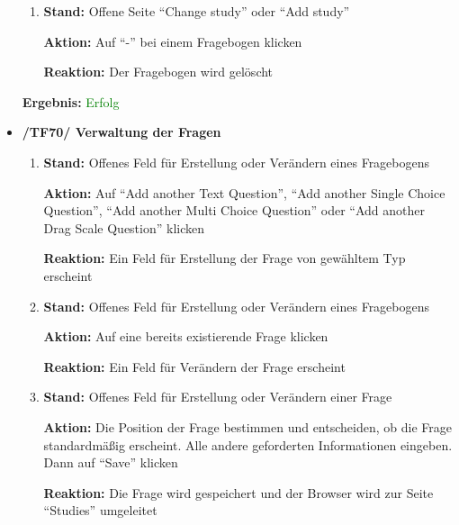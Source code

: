 \documentclass[a4paper]{scrreprt}
\begin{document}
\begin{itemize}
\begin{enumerate}
                        \item \par \textbf{Stand: }Offene Seite ``Change study'' oder ``Add study''
                              \par \textbf{Aktion: }Auf ``-'' bei einem Fragebogen klicken
                              \par \textbf{Reaktion: }Der Fragebogen wird gel\"oscht
                    \end{enumerate}
					\vspace*{0.3cm}
		           \par \textbf{Ergebnis: }\textcolor{green}{Erfolg}
		           \vspace*{0.6cm}

                \item \textbf{/TF70/ Verwaltung der Fragen}
                        \begin{enumerate}
                        \item \par \textbf{Stand: }Offenes Feld f\"ur Erstellung oder Ver\"andern eines Fragebogens
                              \par \textbf{Aktion: }Auf ``Add another Text Question'', ``Add another Single Choice Question'', ``Add another Multi Choice Question'' oder ``Add another Drag Scale Question'' klicken
                              \par \textbf{Reaktion: }Ein Feld f\"ur Erstellung der Frage von gew\"ahltem Typ erscheint
                        \item \par \textbf{Stand: }Offenes Feld f\"ur Erstellung oder Ver\"andern eines Fragebogens
                              \par \textbf{Aktion: }Auf eine bereits existierende Frage klicken
                              \par \textbf{Reaktion: }Ein Feld f\"ur Ver\"andern der Frage erscheint
                        \item \par \textbf{Stand: }Offenes Feld f\"ur Erstellung oder Ver\"andern einer Frage
                              \par \textbf{Aktion: }Die Position der Frage bestimmen und entscheiden, ob die Frage standardm\"aßig erscheint. Alle andere geforderten Informationen eingeben. Dann auf ``Save'' klicken
                              \par \textbf{Reaktion: }Die Frage wird gespeichert und der Browser wird zur Seite ``Studies'' umgeleitet

\end{enumerate}
\end{itemize}
\end{document}
